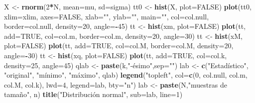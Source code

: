\documentclass[]{book}
\newenvironment{Shaded}{\begin{snugshade}}{\end{snugshade}}
\newcommand{\DataTypeTok}[1]{\textcolor[rgb]{0.13,0.29,0.53}{#1}}
\newcommand{\DecValTok}[1]{\textcolor[rgb]{0.00,0.00,0.81}{#1}}
\newcommand{\KeywordTok}[1]{\textcolor[rgb]{0.13,0.29,0.53}{\textbf{#1}}}
\newcommand{\NormalTok}[1]{#1}
\newcommand{\OperatorTok}[1]{\textcolor[rgb]{0.81,0.36,0.00}{\textbf{#1}}}
\newcommand{\OtherTok}[1]{\textcolor[rgb]{0.56,0.35,0.01}{#1}}
\newcommand{\StringTok}[1]{\textcolor[rgb]{0.31,0.60,0.02}{#1}}
\begin{document}
\begin{Shaded}
\begin{Highlighting}[]
\NormalTok{X <-}\StringTok{ }\KeywordTok{rnorm}\NormalTok{(}\DecValTok{2}\OperatorTok{*}\NormalTok{N, }\DataTypeTok{mean=}\NormalTok{mu, }\DataTypeTok{sd=}\NormalTok{sigma)}
\NormalTok{tt0 <-}\StringTok{ }\KeywordTok{hist}\NormalTok{(X, }\DataTypeTok{plot=}\OtherTok{FALSE}\NormalTok{)}
\KeywordTok{plot}\NormalTok{(tt0, }\DataTypeTok{xlim=}\NormalTok{xlim, }\DataTypeTok{axes=}\OtherTok{FALSE}\NormalTok{, }\DataTypeTok{xlab=}\StringTok{""}\NormalTok{, }\DataTypeTok{ylab=}\StringTok{""}\NormalTok{, }\DataTypeTok{main=}\StringTok{""}\NormalTok{, }
     \DataTypeTok{col=}\NormalTok{col.null, }\DataTypeTok{border=}\NormalTok{col.null, }\DataTypeTok{density=}\DecValTok{20}\NormalTok{, }\DataTypeTok{angle=}\OperatorTok{-}\DecValTok{45}\NormalTok{)}
\NormalTok{tt <-}\StringTok{ }\KeywordTok{hist}\NormalTok{(xm, }\DataTypeTok{plot=}\OtherTok{FALSE}\NormalTok{)}
\KeywordTok{plot}\NormalTok{(tt, }\DataTypeTok{add=}\OtherTok{TRUE}\NormalTok{, }\DataTypeTok{col=}\NormalTok{col.m, }\DataTypeTok{border=}\NormalTok{col.m, }\DataTypeTok{density=}\DecValTok{20}\NormalTok{, }\DataTypeTok{angle=}\DecValTok{30}\NormalTok{)}
\NormalTok{tt <-}\StringTok{ }\KeywordTok{hist}\NormalTok{(xM, }\DataTypeTok{plot=}\OtherTok{FALSE}\NormalTok{)}
\KeywordTok{plot}\NormalTok{(tt, }\DataTypeTok{add=}\OtherTok{TRUE}\NormalTok{, }\DataTypeTok{col=}\NormalTok{col.M, }\DataTypeTok{border=}\NormalTok{col.M, }\DataTypeTok{density=}\DecValTok{20}\NormalTok{, }\DataTypeTok{angle=}\OperatorTok{-}\DecValTok{30}\NormalTok{)}
\NormalTok{tt <-}\StringTok{ }\KeywordTok{hist}\NormalTok{(xq, }\DataTypeTok{plot=}\OtherTok{FALSE}\NormalTok{)}
\KeywordTok{plot}\NormalTok{(tt, }\DataTypeTok{add=}\OtherTok{TRUE}\NormalTok{, }\DataTypeTok{col=}\NormalTok{col.k, }\DataTypeTok{density=}\DecValTok{25}\NormalTok{, }\DataTypeTok{angle=}\DecValTok{45}\NormalTok{)}
\NormalTok{qlab <-}\StringTok{ }\KeywordTok{paste}\NormalTok{(k,}\StringTok{"-ésimo"}\NormalTok{,}\DataTypeTok{sep=}\StringTok{""}\NormalTok{)}
\NormalTok{lab <-}\StringTok{ }\KeywordTok{c}\NormalTok{(}\StringTok{"Estadístico"}\NormalTok{, }\StringTok{"original"}\NormalTok{, }\StringTok{"mínimo"}\NormalTok{, }\StringTok{"máximo"}\NormalTok{, qlab)}
\KeywordTok{legend}\NormalTok{(}\StringTok{"topleft"}\NormalTok{, }\DataTypeTok{col=}\KeywordTok{c}\NormalTok{(}\DecValTok{0}\NormalTok{, col.null, col.m, col.M, col.k), }\DataTypeTok{lwd=}\DecValTok{4}\NormalTok{, }\DataTypeTok{legend=}\NormalTok{lab, }\DataTypeTok{bty=}\StringTok{"n"}\NormalTok{)}
\NormalTok{lab <-}\StringTok{ }\KeywordTok{paste}\NormalTok{(N,}\StringTok{"muestras de tamaño"}\NormalTok{, n)}
\KeywordTok{title}\NormalTok{(}\StringTok{"Distribución normal"}\NormalTok{, }\DataTypeTok{sub=}\NormalTok{lab, }\DataTypeTok{line=}\DecValTok{1}\NormalTok{)}
\end{Highlighting}
\end{Shaded}
\end{document}
